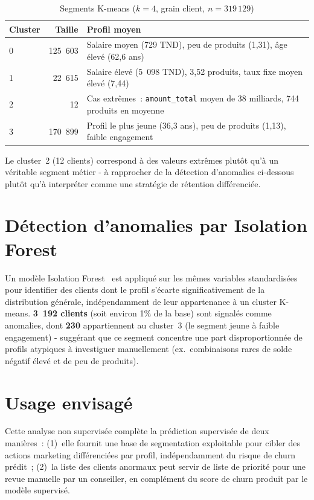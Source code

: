 \documentclass[11pt,a4paper]{report}
\begin{document}
\begin{table}[H]
\centering
\begin{tabular}{lrl}
\toprule
\textbf{Cluster} & \textbf{Taille} & \textbf{Profil moyen} \\
\midrule
0 & 125~603 & Salaire moyen (729 TND), peu de produits (1,31), \^age \'elev\'e (62,6 ans) \\
1 &  22~615 & Salaire \'elev\'e (5~098 TND), 3,52 produits, taux fixe moyen \'elev\'e (7,44) \\
2 &      12 & Cas extr\^emes~: \texttt{amount\_total} moyen de 38 milliards, 744 produits en moyenne \\
3 & 170~899 & Profil le plus jeune (36,3 ans), peu de produits (1,13), faible engagement \\
\bottomrule
\end{tabular}
\caption{Segments K-means ($k=4$, grain client, $n=319\,129$)}
\label{tab:kmeans}
\end{table}

Le cluster~2 (12 clients) correspond \`a des valeurs extr\^emes plut\^ot qu'\`a un
v\'eritable segment m\'etier - \`a rapprocher de la d\'etection d'anomalies
ci-dessous plut\^ot qu'\`a interpr\'eter comme une strat\'egie de r\'etention
diff\'erenci\'ee.

\section{D\'etection d'anomalies par Isolation Forest}

Un mod\`ele Isolation Forest~\citep{liu2008isolation} est appliqu\'e sur les
m\^emes variables standardis\'ees pour identifier des clients dont le profil
s'\'ecarte significativement de la distribution g\'en\'erale, ind\'ependamment de
leur appartenance \`a un cluster K-means. \textbf{3~192 clients} (soit environ
1\% de la base) sont signal\'es comme anomalies, dont \textbf{230} appartiennent
au cluster~3 (le segment jeune \`a faible engagement) - sugg\'erant que ce
segment concentre une part disproportionn\'ee de profils atypiques \`a
investiguer manuellement (ex.\ combinaisons rares de solde n\'egatif \'elev\'e et
de peu de produits).

\section{Usage envisag\'e}

Cette analyse non supervis\'ee compl\`ete la pr\'ediction supervis\'ee de deux
mani\`eres~: (1)~elle fournit une base de segmentation exploitable pour cibler
des actions marketing diff\'erenci\'ees par profil, ind\'ependamment du risque de
churn pr\'edit~; (2)~la liste des clients anormaux peut servir de liste de
priorit\'e pour une revue manuelle par un conseiller, en compl\'ement du score
de churn produit par le mod\`ele supervis\'e.
\end{document}
